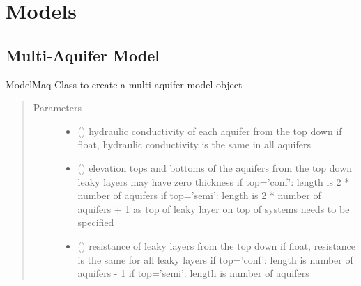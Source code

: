 \documentclass[letterpaper,10pt,english]{sphinxmanual}
\begin{document}
\section{Models}
\label{\detokenize{models/modelindex::doc}}\label{\detokenize{models/modelindex:models}}

\subsection{Multi-Aquifer Model}
\label{\detokenize{models/modelmaq::doc}}\label{\detokenize{models/modelmaq:multi-aquifer-model}}

\begin{fulllineitems}
\label{\detokenize{models/modelmaq:timml.model.ModelMaq}}
ModelMaq Class to create a multi-aquifer model object
\begin{quote}\begin{description}
\item[{Parameters}] \leavevmode\begin{itemize}
\item {} 
 (\sphinxstyleliteralemphasis{, }) \textendash{} hydraulic conductivity of each aquifer from the top down
if float, hydraulic conductivity is the same in all aquifers

\item {} 
 () \textendash{} elevation tops and bottoms of the aquifers from the top down
leaky layers may have zero thickness
if top=’conf’: length is 2 * number of aquifers
if top=’semi’: length is 2 * number of aquifers + 1 as top
of leaky layer on top of systems needs to be specified

\item {} 
 (\sphinxstyleliteralemphasis{, }) \textendash{} resistance of leaky layers from the top down
if float, resistance is the same for all leaky layers
if top=’conf’: length is number of aquifers - 1
if top=’semi’: length is number of aquifers


\end{itemize}
\end{description}
\end{quote}
\end{fulllineitems}
\end{document}
